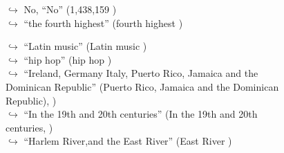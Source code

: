 \documentclass[11pt,a4paper, onecolumn]{article}
\begin{document}
\begin{figure}[t]
\begin{tcolorbox}[boxsep=0pt,left=5pt,right=0pt,top=2pt,colback = yellow!5]
\begin{dialogue}
\colorbox{pink!25}{$\hookrightarrow$}
\colorbox{red!25}{No,}
{ ``No'' (1,438,159 ) }
\\
\colorbox{pink!25}{$\hookrightarrow$}
{ ``the fourth highest'' (fourth highest ) }
\\
 \end{dialogue}\end{tcolorbox}\end{figure}\begin{figure}[t] \small \begin{tcolorbox}[boxsep=0pt,left=5pt,right=0pt,top=2pt,colback = yellow!5] \begin{dialogue}
 \small 
\colorbox{pink!25}{$\hookrightarrow$}
{ ``Latin music'' (Latin music ) }
\\
\colorbox{pink!25}{$\hookrightarrow$}
{ ``hip hop'' (hip hop ) }
\\
\colorbox{pink!25}{$\hookrightarrow$}
{ ``Ireland, Germany Italy, Puerto Rico, Jamaica and the Dominican Republic'' (Puerto Rico, Jamaica and the Dominican Republic), ) }
\\
\colorbox{pink!25}{$\hookrightarrow$}
{ ``In the 19th and 20th centuries'' (In the 19th and 20th centuries, ) }
\\
\colorbox{pink!25}{$\hookrightarrow$}
{ ``Harlem River,and the East River'' (East River ) }
\\
 \end{dialogue}\end{tcolorbox}\end{figure}
\end{document}
